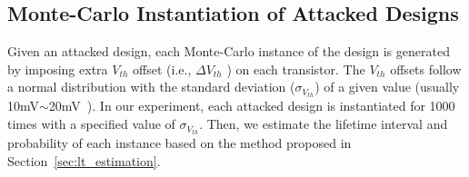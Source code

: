 \subsection{Monte-Carlo Instantiation of Attacked Designs}
\label{sec:ins:mc_ins}
Given an attacked design, each Monte-Carlo instance of the design is generated by imposing extra $V_{th}$ offset (i.e., $\Delta V_{th}$ ) on each transistor. The $V_{th}$ offsets follow a normal distribution with the standard deviation ($\sigma_{V_{th}}$) of a given value (usually 10mV$\sim$20mV~\cite{han2011statistical}\cite{schlunder2017influence}). In our experiment, each attacked design is instantiated for 1000 times with a specified value of $\sigma_{V_{th}}$. Then, we estimate the lifetime interval and probability of each instance based on the method proposed in Section~\ref{sec:lt_estimation}. 


